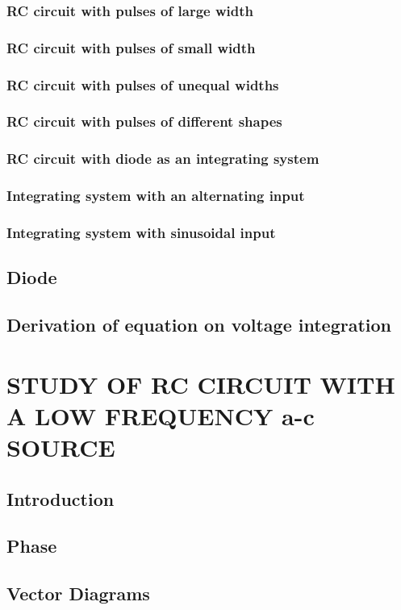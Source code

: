 \documentclass[12pt]{book}
\begin{document}
\subsection{RC circuit with pulses of large width}
\subsection{RC circuit with pulses of small width}
\subsection{RC circuit with pulses of unequal widths}
\subsection{RC circuit with pulses of different shapes}
\subsection{RC circuit with diode as an integrating system}
\subsection{Integrating system with an alternating input}
\subsection{Integrating system with sinusoidal input}
\section{Diode}
\section{Derivation of equation on voltage integration}

\chapter{STUDY OF RC CIRCUIT WITH A LOW FREQUENCY a-c SOURCE}
\section{Introduction}
\section{Phase}
\section{Vector Diagrams}
\end{document}
